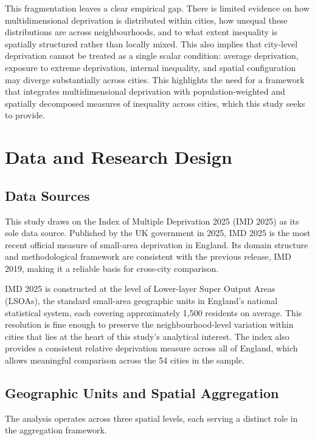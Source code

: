 \documentclass[11pt,journal,compsoc]{IEEEtran}
\begin{document}
This fragmentation leaves a clear empirical gap. There is limited evidence on how multidimensional deprivation is distributed within cities, how unequal these distributions are across neighbourhoods, and to what extent inequality is spatially structured rather than locally mixed. This also implies that city-level deprivation cannot be treated as a single scalar condition: average deprivation, exposure to extreme deprivation, internal inequality, and spatial configuration may diverge substantially across cities. This highlights the need for a framework that integrates multidimensional deprivation with population-weighted and spatially decomposed measures of inequality across cities, which this study seeks to provide.

\section{Data and Research Design}

\subsection{Data Sources}

This study draws on the Index of Multiple Deprivation 2025 (IMD 2025) as its sole data source. Published by the UK government in 2025, IMD 2025 is the most recent official measure of small-area deprivation in England. Its domain structure and methodological framework are consistent with the previous release, IMD 2019, making it a reliable basis for cross-city comparison.

IMD 2025 is constructed at the level of Lower-layer Super Output Areas (LSOAs), the standard small-area geographic units in England's national statistical system, each covering approximately 1,500 residents on average. This resolution is fine enough to preserve the neighbourhood-level variation within cities that lies at the heart of this study's analytical interest. The index also provides a consistent relative deprivation measure across all of England, which allows meaningful comparison across the 54 cities in the sample. 

\subsection{Geographic Units and Spatial Aggregation}

The analysis operates across three spatial levels, each serving a distinct role in the aggregation framework.
\end{document}

